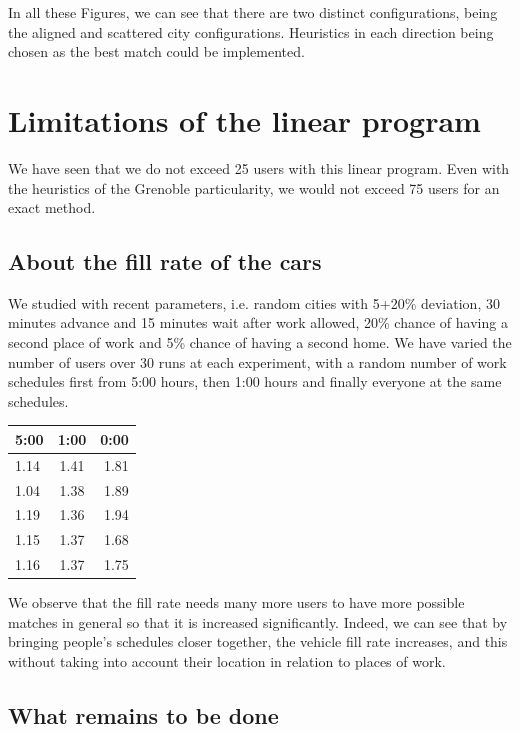\documentclass[12pt, a4paper, twoside]{memoir}
\begin{document}
{	In all these Figures, we can see that there are two distinct configurations, being the aligned and scattered city configurations. Heuristics in each direction being chosen as the best match could be implemented.
	
	\section{Limitations of the linear program}
	
	We have seen that we do not exceed 25 users with this linear program. Even with the heuristics of the Grenoble particularity, we would not exceed 75 users for an exact method.
	
	\subsection{About the fill rate of the cars}
	We studied with recent parameters, i.e. random cities with 5+20\% deviation, 30 minutes advance and 15 minutes wait after work allowed, 20\% chance of having a second place of work and 5\% chance of having a second home. We have varied the number of users over 30 runs at each experiment, with a random number of work schedules first from 5:00 hours, then 1:00 hours and finally everyone at the same schedules.
	\begin{center}
	\begin{tabular}{|l|c|r|}
		\hline
		5:00 & 1:00 & 0:00 \\
		\hline
		1.14 & 1.41 & 1.81 \\
		1.04 & 1.38 & 1.89 \\
		1.19 & 1.36 & 1.94 \\
		1.15 & 1.37 & 1.68 \\
		1.16 & 1.37 & 1.75 \\
		\hline
	\end{tabular}
	\end{center}
	We observe that the fill rate needs many more users to have more possible matches in general so that it is increased significantly. Indeed, we can see that by bringing people's schedules closer together, the vehicle fill rate increases, and this without taking into account their location in relation to places of work.
	
	\subsection{What remains to be done}
	
}
\end{document}
